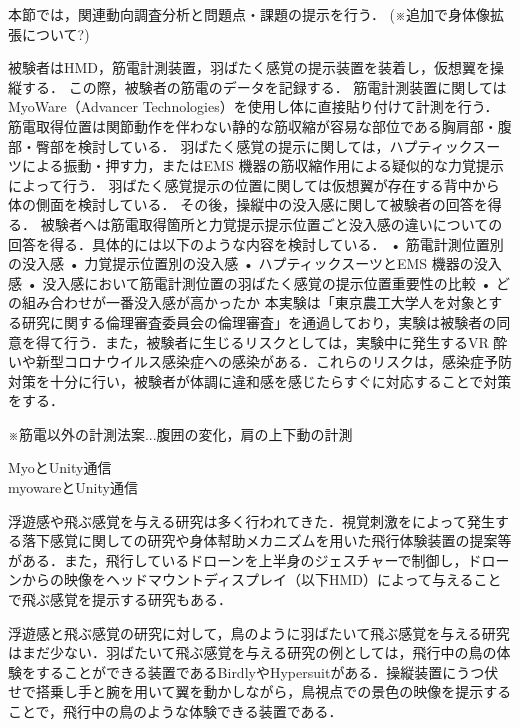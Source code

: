         本節では，関連動向調査分析と問題点・課題の提示を行う．
        (※追加で身体像拡張について?)



        被験者はHMD，筋電計測装置，羽ばたく感覚の提示装置を装着し，仮想翼を操縦する．
この際，被験者の筋電のデータを記録する．
筋電計測装置に関してはMyoWare（Advancer Technologies）を使用し体に直接貼り付けて計測を行う．
筋電取得位置は関節動作を伴わない静的な筋収縮が容易な部位である胸肩部・腹部・臀部を検討している．
羽ばたく感覚の提示に関しては，ハプティックスーツによる振動・押す力，またはEMS 機器の筋収縮作用による疑似的な力覚提示によって行う．
羽ばたく感覚提示の位置に関しては仮想翼が存在する背中から体の側面を検討している．
その後，操縦中の没入感に関して被験者の回答を得る．
被験者へは筋電取得箇所と力覚提示提示位置ごと没入感の違いについての回答を得る．具体的には以下のような内容を検討している．
• 筋電計測位置別の没入感
• 力覚提示位置別の没入感
• ハプティックスーツとEMS 機器の没入感
• 没入感において筋電計測位置の羽ばたく感覚の提示位置重要性の比較
• どの組み合わせが一番没入感が高かったか
本実験は「東京農工大学人を対象とする研究に関する倫理審査委員会の倫理審査」を通過しており，実験は被験者の同意を得て行う．また，被験者に生じるリスクとしては，実験中に発生するVR 酔いや新型コロナウイルス感染症への感染がある．これらのリスクは，感染症予防対策を十分に行い，被験者が体調に違和感を感じたらすぐに対応することで対策をする．

※筋電以外の計測法案...腹囲の変化，肩の上下動の計測





        MyoとUnity通信\\    
        myowareとUnity通信\\



        浮遊感や飛ぶ感覚を与える研究は多く行われてきた．視覚刺激をによって発生する落下感覚に関しての研究\cite{奥川夏輝2017VR空間における視覚刺激によって発生する落下感覚の分析}や身体幇助メカニズムを用いた飛行体験装置の提案\cite{鈴木拓馬2014hmd}等がある．また，飛行しているドローンを上半身のジェスチャーで制御し，ドローンからの映像をヘッドマウントディスプレイ（以下HMD）によって与えることで飛ぶ感覚を提示する研究\cite{rognon2018flyjacket}もある．

        浮遊感と飛ぶ感覚の研究に対して，鳥のように羽ばたいて飛ぶ感覚を与える研究はまだ少ない．羽ばたいて飛ぶ感覚を与える研究の例としては，飛行中の鳥の体験をすることができる装置であるBirdly\cite{rheiner2014birdly}やHypersuit\cite{hypersuit}がある．操縦装置にうつ伏せで搭乗し手と腕を用いて翼を動かしながら，鳥視点での景色の映像を提示することで，飛行中の鳥のような体験できる装置である．



